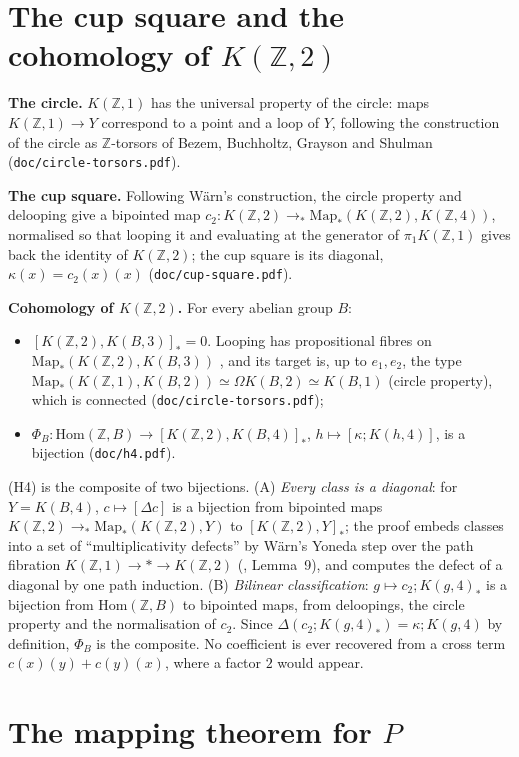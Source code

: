\documentclass[11pt]{amsart}
\theoremstyle{definition}
\theoremstyle{remark}
\newcommand{\Om}{\Omega}
\newcommand{\Map}{\mathrm{Map}_*}
\newcommand{\Z}{\mathbb{Z}}
\newcommand{\code}[1]{\texttt{#1}}
\newcommand{\Hom}{\mathrm{Hom}}
\newcommand{\hc}[2]{[#1,#2]_*}
\newcommand{\cls}[1]{[#1]}
\begin{document}
\section{The cup square and the cohomology of $K(\Z,2)$}

\noindent\textbf{The circle.} $K(\Z,1)$ has the universal property of the circle:
maps $K(\Z,1)\to Y$ correspond to a point and a loop of $Y$, following the
construction of the circle as $\Z$-torsors of Bezem, Buchholtz, Grayson and
Shulman~\cite{BBGS} (\code{doc/circle-torsors.pdf}).

\noindent\textbf{The cup square.} Following W\"arn's construction, the circle property
and delooping give a bipointed map $c_2:K(\Z,2)\to_*\Map(K(\Z,2),K(\Z,4))$, normalised
so that looping it and evaluating at the generator of $\pi_1K(\Z,1)$ gives back the
identity of $K(\Z,2)$; the cup square is its diagonal, $\kappa(x)=c_2(x)(x)$
(\code{doc/cup-square.pdf}).

\noindent\textbf{Cohomology of $K(\Z,2)$.} For every abelian group $B$:
\begin{itemize}
\item[(H3)] $\hc{K(\Z,2)}{K(B,3)}=0$. Looping has propositional fibres
  on $\Map(K(\Z,2),K(B,3))$ \cite{DW1}, and its target is, up to $e_1,e_2$, the type
  $\Map(K(\Z,1),K(B,2))\simeq\Om K(B,2)\simeq K(B,1)$ (circle property), which is
  connected (\code{doc/circle-torsors.pdf});
\item[(H4)] $\Phi_B:\Hom(\Z,B)\to\hc{K(\Z,2)}{K(B,4)}$,
  $h\mapsto\cls{\kappa;K(h,4)}$, is a bijection (\code{doc/h4.pdf}).
\end{itemize}
(H4) is the composite of two bijections. (A) \emph{Every class is a diagonal}: for
$Y=K(B,4)$, $c\mapsto\cls{\Delta c}$ is a bijection from bipointed maps
$K(\Z,2)\to_*\Map(K(\Z,2),Y)$ to $\hc{K(\Z,2)}Y$; the proof embeds classes into a set
of ``multiplicativity defects'' by W\"arn's Yoneda step over the path fibration
$K(\Z,1)\to *\to K(\Z,2)$ (\cite{DW1}, Lemma~9), and computes the defect of a diagonal
by one path induction. (B) \emph{Bilinear classification}: $g\mapsto c_2;K(g,4)_*$ is
a bijection from $\Hom(\Z,B)$ to bipointed maps, from deloopings, the circle property
and the normalisation of $c_2$. Since $\Delta(c_2;K(g,4)_*)=\kappa;K(g,4)$ by
definition, $\Phi_B$ is the composite. No coefficient is ever recovered from a cross
term $c(x)(y)+c(y)(x)$, where a factor $2$ would appear.

\section{The mapping theorem for $P$}
\end{document}
